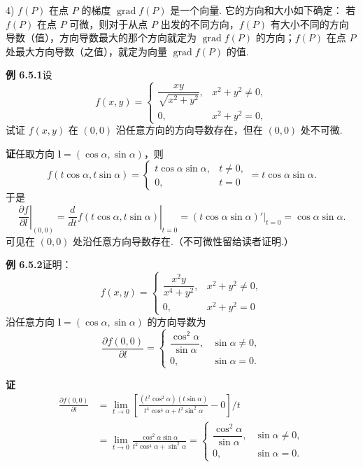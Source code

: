 \documentclass[UTF8,12pt,a4paper,fontset=fandol]{ctexart}
\begin{document}
4) $f(P)$ 在点 $P$ 的梯度 $\operatorname{grad}f(P)$ 是一个向量. 它的方向和大小如下确定：
若 $f(P)$ 在点 $P$ 可微，则对于从点 $P$ 出发的不同方向，$f(P)$ 有大小不同的方向导数（值），方向导数最大的那个方向就定为 $\operatorname{grad}f(P)$ 的方向；$f(P)$ 在点 $P$ 处最大方向导数（之值），就定为向量 $\operatorname{grad}f(P)$ 的值.

\noindent\textbf{例 6.5.1}\quad 设
\[
f(x,y)=
\begin{cases}
  \dfrac{xy}{\sqrt{x^2+y^2}},&x^2+y^2\ne0,\\[6pt]
  0,&x^2+y^2=0,
\end{cases}
\]
试证 $f(x,y)$ 在 $(0,0)$ 沿任意方向的方向导数存在，但在 $(0,0)$ 处不可微.

\noindent\textbf{证}\quad 任取方向 $\mathbf l=(\cos\alpha,\sin\alpha)$，则
\[
f(t\cos\alpha,t\sin\alpha)
=
\begin{cases}
  t\cos\alpha\sin\alpha,&t\ne0,\\
  0,&t=0
\end{cases}
=t\cos\alpha\sin\alpha.
\]
于是
\[
\left.\frac{\partial f}{\partial l}\right|_{(0,0)}
=
\left.\frac d{dt}f(t\cos\alpha,t\sin\alpha)\right|_{t=0}
=(t\cos\alpha\sin\alpha)'|_{t=0}
=\cos\alpha\sin\alpha.
\]
可见在 $(0,0)$ 处沿任意方向导数存在.（不可微性留给读者证明.）

\noindent\textbf{例 6.5.2}\quad 证明：
\[
f(x,y)=
\begin{cases}
  \dfrac{x^2y}{x^4+y^2},&x^2+y^2\ne0,\\[6pt]
  0,&x^2+y^2=0
\end{cases}
\]
沿任意方向 $\mathbf l=(\cos\alpha,\sin\alpha)$ 的方向导数为
\[
\frac{\partial f(0,0)}{\partial l}
=
\begin{cases}
  \dfrac{\cos^2\alpha}{\sin\alpha},&\sin\alpha\ne0,\\[6pt]
  0,&\sin\alpha=0.
\end{cases}
\]

\noindent\textbf{证}\quad
\[
\begin{aligned}
\frac{\partial f(0,0)}{\partial l}
&=\lim_{t\to0}
\left[
\frac{(t^2\cos^2\alpha)(t\sin\alpha)}
     {t^4\cos^4\alpha+t^2\sin^2\alpha}
-0
\right]\bigg/t\\
&=\lim_{t\to0}\frac{\cos^2\alpha\sin\alpha}{t^2\cos^4\alpha+\sin^2\alpha}
=
\begin{cases}
  \dfrac{\cos^2\alpha}{\sin\alpha},&\sin\alpha\ne0,\\[6pt]
  0,&\sin\alpha=0.
\end{cases}
\end{aligned}
\]
\end{document}
